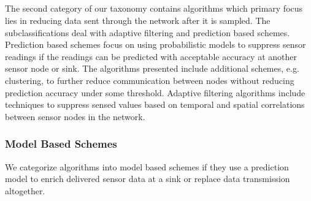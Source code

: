 \subsection{\catII} %
\label{sec:catII}

The second category of our taxonomy contains algorithms which primary focus
lies in reducing data sent through the network after it is sampled. The
subclassifications deal with adaptive filtering and prediction based schemes.
Prediction based schemes focus on using probabilistic models to suppress sensor
readings if the readings can be predicted with acceptable accuracy at another
sensor node or sink. The algorithms presented include additional schemes, e.g.
clustering, to further reduce communication between nodes without reducing
prediction accuracy under some threshold. Adaptive filtering algorithms include
techniques to suppress sensed values based on temporal and spatial correlations
between sensor nodes in the network.


\subsubsection{Model Based Schemes}
\label{sec:Model Based Schemes}

We categorize algorithms into model based schemes if they use a prediction
model to enrich delivered sensor data at a sink or replace data transmission
altogether. 

